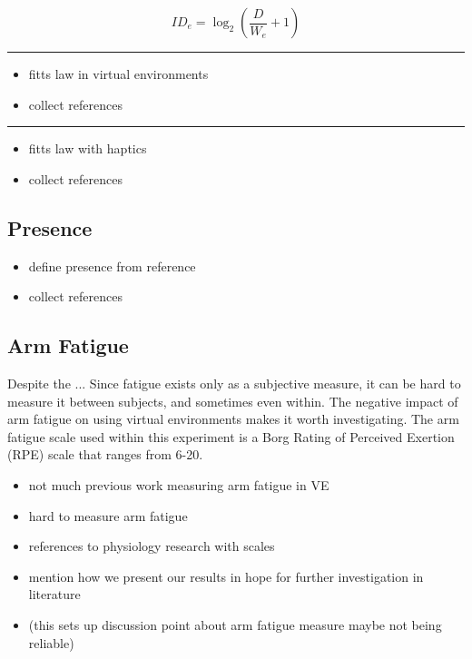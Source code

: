 \begin{equation}
    {ID}_e=\log_2\left(\frac{D}{W_e}+1\right)
\end{equation}

\rule{0.75\textwidth}{1pt}
\begin{itemize}
  \item fitts law in virtual environments
  \item collect references
\end{itemize}

\rule{0.75\textwidth}{1pt}
\begin{itemize}
  \item fitts law with haptics
  \item collect references
\end{itemize}

\subsection{Presence}

\begin{itemize}
  \item define presence from reference
  \item collect references
\end{itemize}

\subsection{Arm Fatigue}

Despite the ...
Since fatigue exists only as a subjective measure, it can be hard to measure it between subjects, and sometimes even within.
The negative impact of arm fatigue on using virtual environments makes it worth investigating.
The arm fatigue scale used within this experiment is a Borg Rating of Perceived Exertion (RPE) scale that ranges from 6-20.

\begin{itemize}
  \item not much previous work measuring arm fatigue in VE
  \item hard to measure arm fatigue
  \item references to physiology research with scales
  \item mention how we present our results in hope for further investigation in literature
  \item (this sets up discussion point about arm fatigue measure maybe not being reliable)
\end{itemize}

